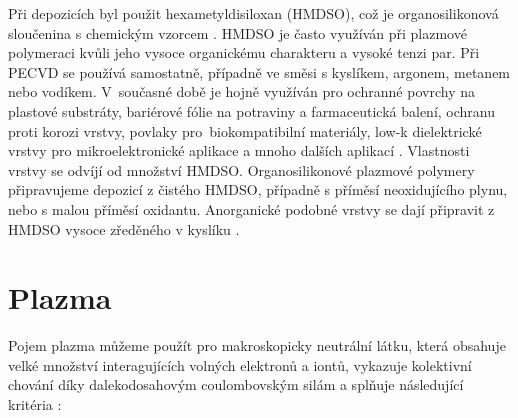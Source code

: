 \documentclass[12pt,oneside,final]{fithesis2}
\begin{document}
Při depozicích byl použit hexametyldisiloxan (HMDSO), což je organosilikonová sloučenina s chemickým vzorcem  . HMDSO je často využíván při plazmové polymeraci kvůli jeho vysoce organickému charakteru a vysoké tenzi par. Při PECVD se používá samostatně, případně ve směsi s kyslíkem, argonem, metanem nebo vodíkem. V~současné době je hojně využíván pro ochranné povrchy na plastové substráty, bariérové fólie na potraviny a farmaceutická balení, ochranu proti korozi vrstvy, povlaky pro~biokompatibilní materiály, low-k dielektrické vrstvy pro mikroelektronické aplikace a mnoho dalších aplikací \cite{zajickova2007}. Vlastnosti vrstvy se odvíjí od množství HMDSO. Organosilikonové plazmové polymery připravujeme depozicí z čistého HMDSO, případně s příměsí neoxidujícího plynu, nebo s malou příměsí oxidantu. Anorganické  podobné vrstvy se dají připravit z HMDSO vysoce zředěného v kyslíku \cite{zajickova2007b}. 



\chapter{Plazma}

Pojem plazma můžeme použít pro makroskopicky neutrální látku, která obsahuje velké množství interagujících volných elektronů a ion\-tů, vykazuje kolektivní chování díky dalekodosahovým coulombov\-ským silám a splňuje následující kritéria \cite{bittencourtplasmadef}:
\end{document}
